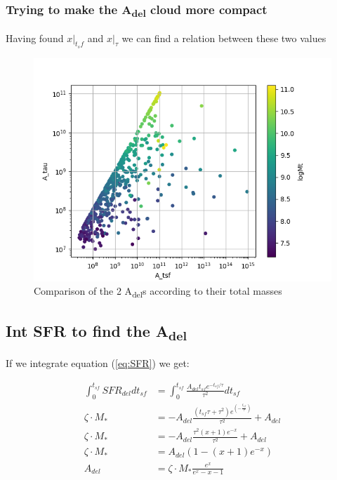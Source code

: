 \documentclass[a4paper,twocolumn]{article}
\begin{document}
\subsubsection{Trying to make the A\textsubscript{del} cloud more compact}
\label{sec:orgc5da7e1}

Having found \(x|_{t_sf}\) and \(x|_{\tau}\) we can find a relation between these two values

\begin{figure}[!htpb]
\centering
\includegraphics[width=.9\linewidth]{./figs/A_tau-A_tsf_Mt.png}
\caption{\label{fig:Comparison of the 2 A_{del}s according to their total masses}Comparison of the 2 A\textsubscript{del}s according to their total masses}
\end{figure}


\subsection{Int SFR to find the A\textsubscript{del}}
\label{sec:org6191eb1}

If we integrate equation (\ref{eq:SFR}) we get:


\begin{equation}\label{eq:int SFR}
\begin{align}
\int^{t_{sf}}_0 SFR_{del} dt_{sf}&=\int^{t_{sf}}_0 \frac{A_{del}t_{sf}e^{-t_{sf}/\tau}}{\tau^2} dt_{sf}\\
\zeta\cdot M_*&=-A_{del} \frac{{\left(t_{\mathit{sf}} \tau + \tau^{2}\right)} e^{\left(-\frac{t_{\mathit{sf}}}{\tau}\right)}}{\tau^{2}}+A_{del}\\
\zeta\cdot M_*&=-A_{del}\frac{\tau^2(x+1)e^{-x}}{\tau^2}+A_{del}\\
\zeta\cdot M_*& = A_{del}(1-(x+1)e^{-x})\\
A_{del}&=\zeta\cdot M_*\frac{e^x}{e^x-x-1}
\end{align}
\end{equation}
\end{document}

